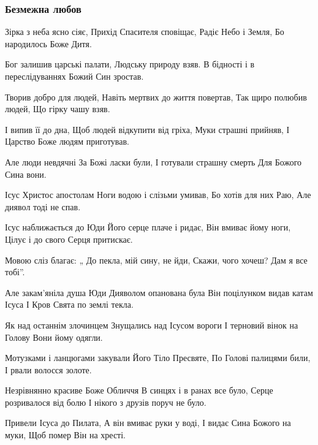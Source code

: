  
 
 

\subsubsection{Безмежна любов}
\label{sec:poetry.rus.anastasia_lagan_1954.bezmezhna_lubov}

Зірка з неба ясно сіяє,
Прихід Спасителя сповіщає,
Радіє Небо і Земля,
Бо народилось Боже Дитя.

Бог залишив царські палати,
Людську природу взяв.
В бідності і в переслідуваннях
Божий Син зростав.

Творив добро для людей,
Навіть мертвих до життя повертав,
Так щиро полюбив людей,
Що гірку чашу взяв.

І випив її до дна,
Щоб людей відкупити від гріха,
Муки страшні прийняв,
І Царство Боже людям приготував.

Але люди невдячні
За Божі ласки були,
І готували страшну смерть
Для Божого Сина вони.

Ісус Христос апостолам
Ноги водою і слізьми умивав,
Бо хотів для них Раю,
Але диявол тоді не спав.

Ісус наближається до Юди
Його серце плаче і ридає,
Він вмиває йому ноги,
Цілує і до свого Серця притискає.

Мовою сліз благає:
„ До пекла, мій сину, не йди,
Скажи, чого хочеш?
Дам я все тобі”.

Але закам’яніла душа Юди
Дияволом опанована була
Він поцілунком видав катам Ісуса
І Кров Свята по землі текла.

Як над останнім злочинцем
Знущались над Ісусом вороги
І терновий вінок на Голову
Вони йому одягли.

Мотузками і ланцюгами закували
Його Тіло Пресвяте,
По Голові палицями били,
І рвали волосся золоте.

Незрівнянно красиве Боже Обличчя
В синцях і в ранах все було,
Серце розривалося від болю
І нікого з друзів поруч не було.

Привели Ісуса до Пилата,
А він вмиває руки у воді,
І видає Сина Божого на муки,
Щоб помер Він на хресті.

